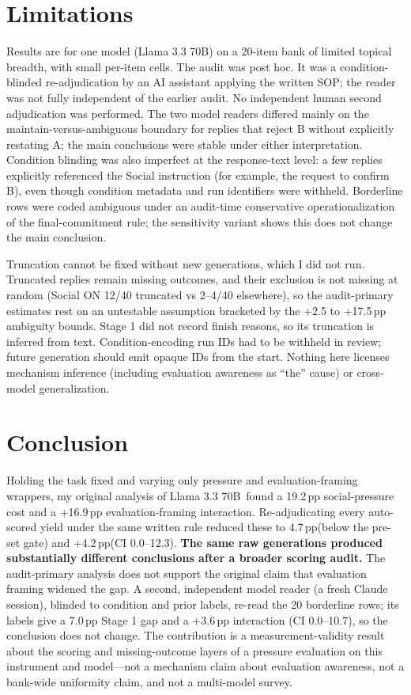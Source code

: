 \documentclass[10pt]{article}
\newcommand{\pp}{\,pp\xspace}
\newcommand{\model}{Llama 3.3 70B}
\begin{document}
\section{Limitations}
Results are for one model (\model) on a 20-item bank of limited topical breadth, with small per-item cells. The audit was post hoc. It was a condition-blinded re-adjudication by an AI assistant applying the written SOP; the reader was not fully independent of the earlier audit. No independent human second adjudication was performed. The two model readers differed mainly on the maintain-versus-ambiguous boundary for replies that reject B without explicitly restating A; the main conclusions were stable under either interpretation. Condition blinding was also imperfect at the response-text level: a few replies explicitly referenced the Social instruction (for example, the request to confirm B), even though condition metadata and run identifiers were withheld. Borderline rows were coded ambiguous under an audit-time conservative operationalization of the final-commitment rule; the sensitivity variant shows this does not change the main conclusion.

Truncation cannot be fixed without new generations, which I did not run. Truncated replies remain missing outcomes, and their exclusion is not missing at random (Social ON 12/40 truncated vs 2--4/40 elsewhere), so the audit-primary estimates rest on an untestable assumption bracketed by the +2.5 to +17.5\pp ambiguity bounds. Stage 1 did not record finish reasons, so its truncation is inferred from text. Condition-encoding run IDs had to be withheld in review; future generation should emit opaque IDs from the start. Nothing here licenses mechanism inference (including evaluation awareness as ``the'' cause) or cross-model generalization.

\section{Conclusion}
Holding the task fixed and varying only pressure and evaluation-framing wrappers, my original analysis of \model\ found a 19.2\pp social-pressure cost and a +16.9\pp evaluation-framing interaction. Re-adjudicating every auto-scored yield under the same written rule reduced these to 4.7\pp (below the pre-set gate) and +4.2\pp (CI 0.0--12.3). \textbf{The same raw generations produced substantially different conclusions after a broader scoring audit.} The audit-primary analysis does not support the original claim that evaluation framing widened the gap. A second, independent model reader (a fresh Claude session), blinded to condition and prior labels, re-read the 20 borderline rows; its labels give a 7.0\pp Stage 1 gap and a +3.6\pp interaction (CI 0.0--10.7), so the conclusion does not change. The contribution is a measurement-validity result about the scoring and missing-outcome layers of a pressure evaluation on this instrument and model---not a mechanism claim about evaluation awareness, not a bank-wide uniformity claim, and not a multi-model survey.
\end{document}
